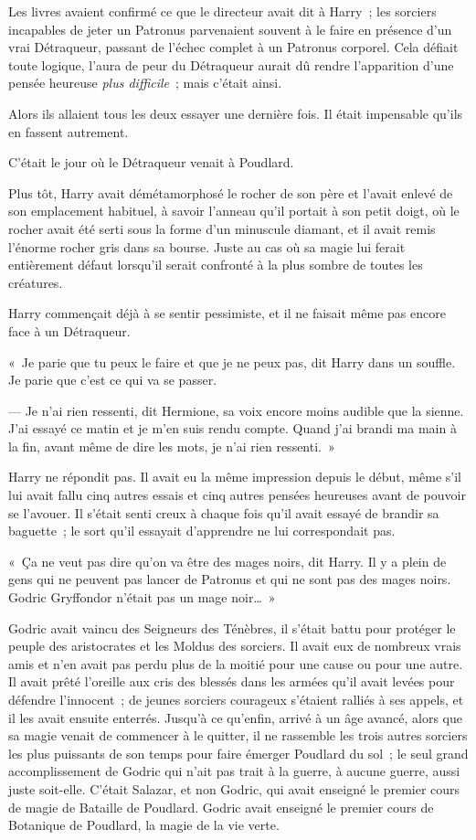 Les livres avaient confirmé ce que le directeur avait dit à Harry~; les sorciers incapables de jeter un Patronus parvenaient souvent à le faire en présence d'un vrai Détraqueur, passant de l'échec complet à un Patronus corporel.
Cela défiait toute logique, l'aura de peur du Détraqueur aurait dû rendre l'apparition d'une pensée heureuse \emph{plus difficile}~; mais c'était ainsi.

Alors ils allaient tous les deux essayer une dernière fois.
Il était impensable qu'ils en fassent autrement.

C'était le jour où le Détraqueur venait à Poudlard.

Plus tôt, Harry avait démétamorphosé le rocher de son père et l'avait enlevé de son emplacement habituel, à savoir l'anneau qu'il portait à son petit doigt, où le rocher avait été serti sous la forme d'un minuscule diamant, et il avait remis l'énorme rocher gris dans sa bourse.
Juste au cas où sa magie lui ferait entièrement défaut lorsqu'il serait confronté à la plus sombre de toutes les créatures.

Harry commençait déjà à se sentir pessimiste, et il ne faisait même pas encore face à un Détraqueur.

«~Je parie que tu peux le faire et que je ne peux pas, dit Harry dans un souffle.
Je parie que c'est ce qui va se passer.

--- Je n'ai rien ressenti, dit Hermione, sa voix encore moins audible que la sienne.
J'ai essayé ce matin et je m'en suis rendu compte.
Quand j'ai brandi ma main à la fin, avant même de dire les mots, je n'ai rien ressenti.~»

Harry ne répondit pas.
Il avait eu la même impression depuis le début, même s'il lui avait fallu cinq autres essais et cinq autres pensées heureuses avant de pouvoir se l'avouer.
Il s'était senti creux à chaque fois qu'il avait essayé de brandir sa baguette~; le sort qu'il essayait d'apprendre ne lui correspondait pas.

«~Ça ne veut pas dire qu'on va être des mages noirs, dit Harry.
Il y a plein de gens qui ne peuvent pas lancer de Patronus et qui ne sont pas des mages noirs.
Godric Gryffondor n'était pas un mage noir…~»

Godric avait vaincu des Seigneurs des Ténèbres, il s'était battu pour protéger le peuple des aristocrates et les Moldus des sorciers.
Il avait eux de nombreux vrais amis et n'en avait pas perdu plus de la moitié pour une cause ou pour une autre.
Il avait prêté l'oreille aux cris des blessés dans les armées qu'il avait levées pour défendre l'innocent~; de jeunes sorciers courageux s'étaient ralliés à ses appels, et il les avait ensuite enterrés.
Jusqu'à ce qu'enfin, arrivé à un âge avancé, alors que sa magie venait de commencer à le quitter, il ne rassemble les trois autres sorciers les plus puissants de son temps pour faire émerger Poudlard du sol~; le seul grand accomplissement de Godric qui n'ait pas trait à la guerre, à aucune guerre, aussi juste soit-elle.
C'était Salazar, et non Godric, qui avait enseigné le premier cours de magie de Bataille de Poudlard.
Godric avait enseigné le premier cours de Botanique de Poudlard, la magie de la vie verte.

